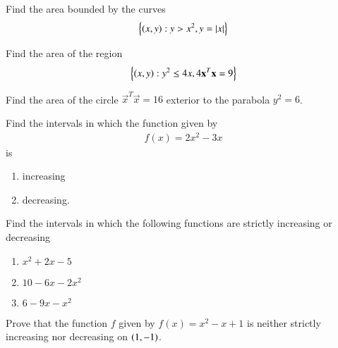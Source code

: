 %
\item Find the area bounded by the curves
\begin{align}
\left\{\left(x,y\right) : y > x^2, y = \left\vert x\right\vert\right\}
\end{align}
%
\item Find the area of the region
\begin{align}
\left\{\left(x,y\right) : y^2 \le 4x, 4\mathbf{x}^T\mathbf{x} = 9\right\}
\end{align}
%
\item Find the area of the circle $\vec{x}^T\vec{x} = 16$ exterior to the parabola $y^2 = 6$.
%
\item Find the intervals in which the function given by 
\begin{align}
f(x)  = 2x^2-3x
\end{align}
%
is 
\begin{enumerate}
\item increasing
\item decreasing.
\end{enumerate}
%
\item Find the intervals in which the following functions are strictly increasing or decreasing
%
\begin{enumerate}
\item $x^2+2x-5$
\item $10-6x-2x^2$
\item $6-9x-x^2$
\end{enumerate}
%
\item Prove that the function $f$ given by $f(x) = x^2-x+1$ is neither strictly increasing nor decreasing on $\left(1,-1\right)$.
